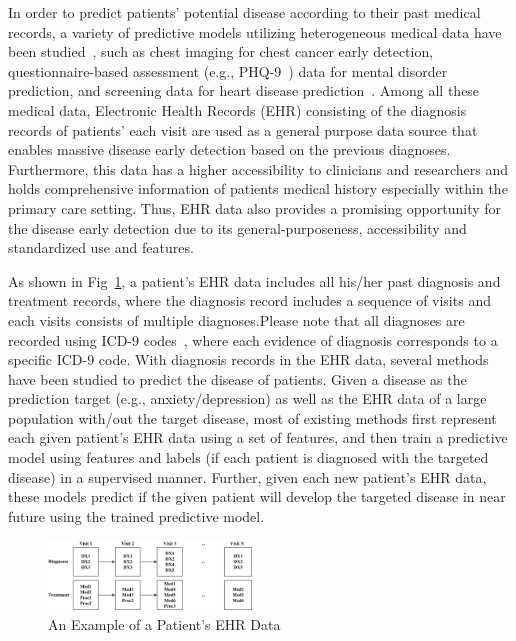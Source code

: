 \documentclass[journal,compsoc]{IEEEtran}
\begin{document}
In order to predict patients' potential disease according to their past medical records, a variety of predictive models utilizing heterogeneous medical data have been studied~\cite{soni2011predictive,palaniappan2008intelligent,kumari2011comparative}, such as chest imaging for chest cancer early detection, questionnaire-based assessment (e.g., PHQ-9~\cite{kroenke2002phq}) data for mental disorder prediction, and screening data for heart disease prediction~\cite{d2001validation}.
Among all these medical data, Electronic Health Records (EHR) consisting of the diagnosis records of patients' each visit are used as a general purpose data source that enables massive disease early detection based on the previous diagnoses.
Furthermore, this data has a higher accessibility to clinicians and researchers and holds comprehensive information of patients medical history especially within the primary care setting.
Thus, EHR data also provides a promising opportunity for the disease early detection due to its general-purposeness, accessibility and standardized use and features. 


As shown in Fig~\ref{fig:exp-ehr}, a patient's EHR data includes all his/her past diagnosis and treatment records, where the diagnosis record includes a sequence of visits and each visits consists of multiple diagnoses.Please note that all diagnoses are recorded using ICD-9 codes~\cite{dubberke2006icd}, where each evidence of diagnosis corresponds to a specific ICD-9 code.
With diagnosis records in the EHR data, several methods~\cite{personalized2015, amarasingham2010automated, pittman2004integrated,jensen2012mining} have been studied to predict the disease of patients.
Given a disease as the prediction target (e.g., anxiety/depression) as well as the EHR data of a large population with/out the target disease, most of existing methods first represent each given patient's EHR data using a set of features, and then train a predictive model using features and labels (if each patient is diagnosed with the targeted disease) in a supervised manner.
Further, given each new patient's EHR data, these models predict if the given patient will develop the targeted disease in near future using the trained predictive model.


\begin{figure}
\centering
\includegraphics[width=0.48\textwidth]{./img/Patient.png}
\caption{An Example of a Patient's EHR Data}
\label{fig:exp-ehr}
\end{figure}
\end{document}
